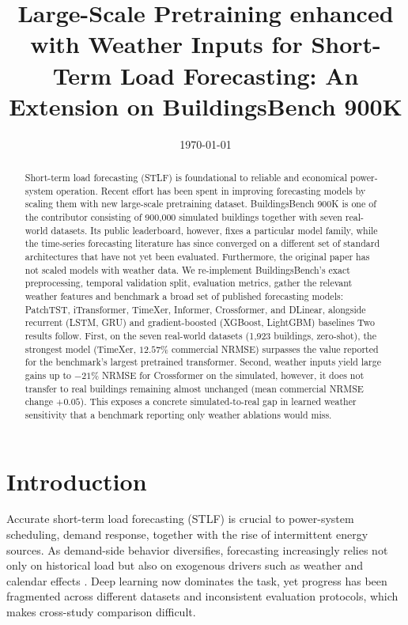 \documentclass[11pt]{article}
\title{\textbf{Large-Scale Pretraining enhanced with Weather Inputs for
Short-Term Load Forecasting: An Extension on BuildingsBench 900K}}
\author[1]{\todo{Author One}}
\author[1]{\todo{Author Two}}
\affil[1]{\todo{Affiliation}}
\date{\today}
\begin{document}
\maketitle

\begin{abstract}
Short-term load forecasting (STLF) is foundational to reliable and economical power-system
operation. Recent effort has been spent in improving forecasting models by scaling them with new large-scale pretraining dataset.  BuildingsBench 900K is one of the contributor consisting of 900{,}000 simulated buildings together with seven
real-world datasets. Its public leaderboard, however, fixes a particular model
family, while the time-series forecasting literature has since converged on a
different set of standard architectures that have not yet been evaluated. Furthermore, the original paper has not scaled models with weather data. 
We re-implement BuildingsBench's exact preprocessing, temporal
validation split, evaluation metrics, gather the relevant weather features and benchmark a broad set of
 published forecasting models: PatchTST, iTransformer, TimeXer, Informer,
Crossformer, and DLinear, alongside recurrent (LSTM, GRU) and gradient-boosted
(XGBoost, LightGBM) baselines 
Two results
follow. First, on the seven real-world datasets (1{,}923 buildings, zero-shot), the
strongest model (TimeXer, $12.57\%$ commercial NRMSE) surpasses the value reported
for the benchmark's largest pretrained transformer. Second,
weather inputs yield large gains up to $-21\%$ NRMSE for
Crossformer on the simulated, however, it does not transfer to real buildings remaining almost unchanged
(mean commercial NRMSE change $+0.05$). This exposes a concrete simulated-to-real
gap in learned weather sensitivity that a benchmark reporting only
weather ablations would miss.
\end{abstract}

\section{Introduction}
\label{sec:intro}
Accurate short-term load forecasting (STLF) is crucial to power-system scheduling,
demand response, together with the rise of intermittent energy sources. As
demand-side behavior diversifies, forecasting increasingly relies not only on
historical load but also on exogenous drivers such as weather and calendar
effects \citep{buildingsbench2023}. Deep learning now dominates the task, yet
progress has been fragmented across different datasets and inconsistent
evaluation protocols, which makes cross-study comparison difficult.
\end{document}
